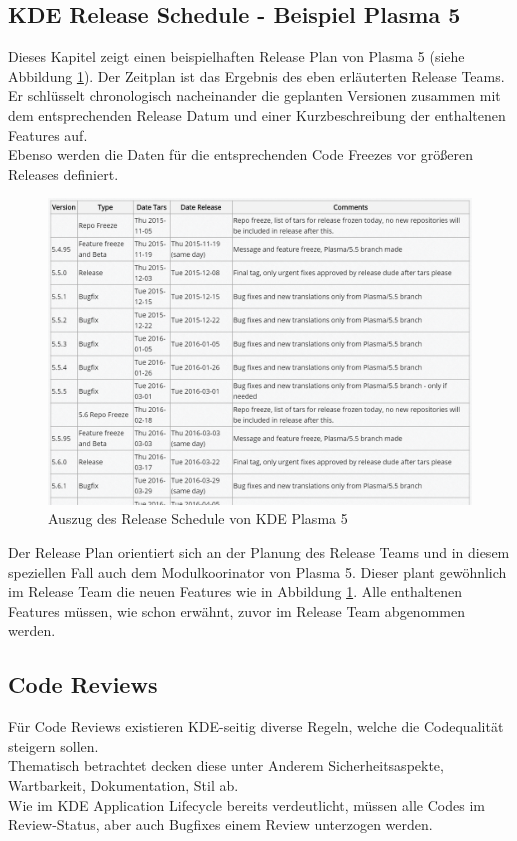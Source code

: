 \subsection{KDE Release Schedule - Beispiel Plasma 5 \cite{KDEReleaseSchedulePlasma5}}
Dieses Kapitel zeigt einen beispielhaften Release Plan von Plasma 5 (siehe Abbildung \ref{fig:kde_schedulePlasma5}). Der Zeitplan ist das Ergebnis des eben erläuterten Release Teams.\\
Er schlüsselt chronologisch nacheinander die geplanten Versionen zusammen mit dem entsprechenden Release Datum und einer Kurzbeschreibung der enthaltenen Features auf.\\
Ebenso werden die Daten für die entsprechenden Code Freezes vor größeren Releases definiert.
\begin{figure}[h]
	\centering
	\includegraphics[width=\columnwidth]{images/KDE_schedule_plasma5.png}
	\caption{Auszug des Release Schedule von KDE Plasma 5 \cite{KDEReleaseSchedulePlasma5}}
	\label{fig:kde_schedulePlasma5}
\end{figure}
Der Release Plan orientiert sich an der Planung des Release Teams und in diesem speziellen Fall auch dem Modulkoorinator von Plasma 5. Dieser plant gewöhnlich im Release Team die neuen Features wie in Abbildung \ref{fig:kde_schedulePlasma5}. Alle enthaltenen Features müssen, wie schon erwähnt, zuvor im Release Team abgenommen werden. 
\cite{KDEReleaseSchedulePlasma5}

\subsection{Code Reviews \cite{KDECodeReview}}
Für Code Reviews existieren KDE-seitig diverse Regeln, welche die Codequalität steigern sollen.\\
Thematisch betrachtet decken diese unter Anderem Sicherheitsaspekte, Wartbarkeit, Dokumentation, Stil ab.\\
Wie im KDE Application Lifecycle bereits verdeutlicht, müssen alle Codes im Review-Status, aber auch Bugfixes einem Review unterzogen werden.
\cite{KDECodeReview}

%

